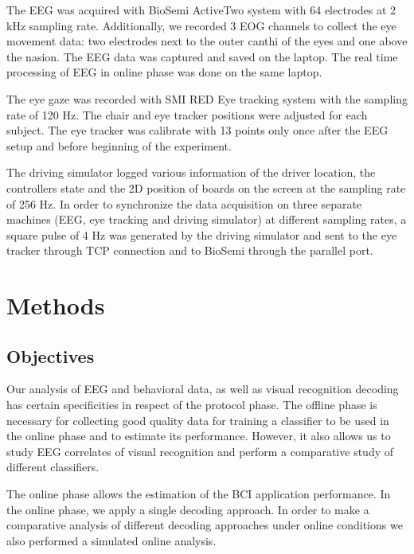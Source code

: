 \documentclass[12pt]{iopart}
\begin{document}
The EEG was acquired with BioSemi ActiveTwo system with 64 electrodes at 2 kHz sampling rate.
Additionally, we recorded 3 EOG channels to collect the eye movement data:
two electrodes next to the outer canthi of the eyes and one above the nasion.
The EEG data was captured and saved on the laptop. The real time processing
of EEG in online phase was done on the same laptop.

The eye gaze was recorded with SMI RED Eye tracking system with the sampling rate of 120 Hz.
The chair and eye tracker positions were adjusted for each subject. The eye tracker
was calibrate with 13 points only once after the EEG setup and before beginning of 
the experiment.

The driving simulator logged various information of the driver location,
the controllers state and the 2D position of boards on the screen at the sampling rate
of 256 Hz. In order to synchronize the data acquisition on three separate machines
(EEG, eye tracking and driving simulator) at different sampling rates,
a square pulse of 4 Hz was generated by the driving simulator and sent 
to the eye tracker through TCP connection and to BioSemi through the parallel port.




\section{Methods}
\label{sec:methods}
\subsection{Objectives}
Our analysis of EEG and behavioral data, as well as visual
recognition decoding has certain specificities in respect of
the protocol phase.
The offline phase is necessary for collecting good quality data
for training a classifier to be used in the online phase
and to estimate its performance. However, it also allows us 
to study EEG correlates of visual recognition and  perform a
comparative study of different classifiers.

The online phase allows the estimation of the BCI
application performance.
In the online phase, we apply a single decoding approach. 
In order to make a comparative analysis of different
decoding approaches under online conditions we also performed a simulated online analysis. 
\end{document}
